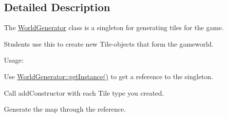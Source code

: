 \subsection{Detailed Description}
The \hyperlink{classCourse_1_1WorldGenerator}{World\-Generator} class is a singleton for generating tiles for the game. 

Students use this to create new Tile-\/objects that form the gameworld. \par
Usage\-:
\begin{DoxyEnumerate}
\item Use \hyperlink{classCourse_1_1WorldGenerator_a2b94f9ec5aa516b6528d90fa81868900}{World\-Generator\-::get\-Instance()} to get a reference to the singleton.
\item Call add\-Constructor with each Tile type you created.
\item Generate the map through the reference. 
\end{DoxyEnumerate}

